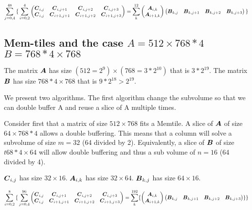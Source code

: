 \documentclass[conference]{IEEEtran}
\begin{document}
{\small \begin{equation*}
    \sum_{j=0,4}^{48}
    { \{} \sum_{i=0,2}^4
  \begin{pmatrix}
    {\boldsymbol C}_{i,j}  & {\boldsymbol C}_{i,j+1}    & {\boldsymbol C}_{i,j+2}    &{\boldsymbol C}_{i,j+3} \\
    {\boldsymbol C}_{i,j}  & {\boldsymbol C}_{i+1,j+1}   & {\boldsymbol C}_{i+1,j+2}  & {\boldsymbol C}_{i+1,j+3} \\
  \end{pmatrix}    = \sum_k^{12}
  \begin{pmatrix}
    {\boldsymbol A}_{i,k}  \\
    {\boldsymbol A}_{i+1,k}   \\
  \end{pmatrix}  
  \begin{pmatrix}
    {\boldsymbol B}_{k,j}  &  {\boldsymbol B}_{k,j+1}  & {\boldsymbol B}_{k,j+2}  &{\boldsymbol B}_{k,j+3} \\
  \end{pmatrix}
  { \}}    
\end{equation*}
}


\subsection{Mem-tiles and the case $A=512\times 768*4$ $B=768*4 \times 768$ }
The matrix ${\boldsymbol A}$ has size $(512=2^9) \times (768= 3*2^{10})$ that
is $3*2^{19}$.  The matrix ${\boldsymbol B}$ has size $768*4 \times 768$ that
is $9*2^{18}>2^{19}$.

We present two algorithms. The first algorithm change the subvolume so
that we can double buffer A and reuse a slice of A multiple times.

Consider first that a matrix of size $512 \times 768$ fits a Memtile.
A slice of ${\boldsymbol A}$ of size $64 \times 768*4$ allows a double
buffering. This means that a column will solve a subvolume of size
$m=32$ (64 divided by 2). Equivalently, a slice of ${\boldsymbol B}$ of size
$t68*4 \times 64$ will allow double buffering and thus a sub volume of
$n=16$ (64 divided by 4). 

${\boldsymbol C}_{i,j}$ has size $32 \times 16$.   ${\boldsymbol A}_{i,k}$ has size $32 \times 64$. ${\boldsymbol B}_{k,j}$ has size $64 \times 16$.      

{\small \begin{equation*}
    \sum_{i=0,2}^{8}
    { \{} \sum_{j=0,4}^{96}
  \begin{pmatrix}
    {\boldsymbol C}_{i,j}  & {\boldsymbol C}_{i,j+1}    & {\boldsymbol C}_{i,j+2}    &{\boldsymbol C}_{i,j+3} \\
    {\boldsymbol C}_{i,j}  & {\boldsymbol C}_{i+1,j+1}   & {\boldsymbol C}_{i+1,j+2}  & {\boldsymbol C}_{i+1,j+3} \\
  \end{pmatrix}    = \sum_k^{192}
  \{
  \begin{pmatrix}
    {\boldsymbol A}_{i,k}  \\
    {\boldsymbol A}_{i+1,k}   \\
  \end{pmatrix}  
  \begin{pmatrix}
    {\boldsymbol B}_{k,j}  &  {\boldsymbol B}_{k,j+1}  & {\boldsymbol B}_{k,j+2}  &{\boldsymbol B}_{k,j+3} \\
  \end{pmatrix}
  \}
  { \}}    
\end{equation*}
}
\end{document}

